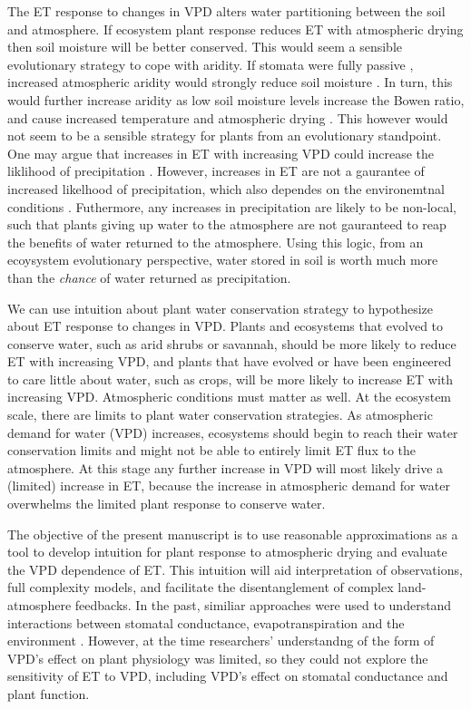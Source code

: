 \documentclass[draft,linenumbers]{agujournal}
\begin{document}
The ET response to changes in VPD alters water partitioning between
the soil and atmosphere. If ecosystem plant response reduces ET with atmospheric
drying then soil moisture will be better conserved. This would seem a
sensible evolutionary strategy to cope with aridity. If stomata were
fully passive \citep [similar to soil pores, e.g. ][]{Or_2013},
increased atmospheric aridity would strongly reduce soil moisture
\citep{Berg_2017}. In turn, this would further increase aridity as low
soil moisture levels increase the Bowen ratio, and cause increased
temperature and atmospheric drying \citep[][]{Bouchet_1963,
  Morton_1965, Brutsaert_1999, Ozdogan_2006, Salvucci_2013,
  Gentine_2016, Berg_2016}. This however would not seem to be a
sensible strategy for plants from an evolutionary standpoint. One may
argue that increases in ET with increasing VPD could increase the
liklihood of precipitation \citep[e.g.,][]{Findell_2011}. However,
increases in ET are not a gaurantee
of increased likelhood of precipitation, which also dependes on the
environemtnal conditions \citep[][]{Gentine_2013}. Futhermore,  any
increases in precipitation are likely to be non-local, such that plants giving up
water to the atmosphere are not gauranteed to reap the benefits of
water returned to the atmosphere. Using this logic, from an ecoysystem
evolutionary perspective, water stored in soil is worth much more than
the \textit{chance} of water returned as precipitation. 

We can use intuition about plant water conservation strategy to
hypothesize about ET response to changes in VPD. Plants and ecosystems
that evolved to conserve water, such as arid shrubs or savannah,
should be more likely to reduce ET with increasing VPD, and plants
that have evolved or have been engineered to care little about water,
such as crops, will be more likely to increase ET with increasing
VPD. Atmospheric conditions must matter as well. At the ecosystem
scale, there are limits to plant water conservation strategies. As
atmospheric demand for water (VPD) increases, ecosystems should begin
to reach their water conservation limits and might not be able to
entirely limit ET flux to the atmosphere. At this stage any further
increase in VPD will most likely drive a (limited) increase in ET,
because the increase in atmospheric demand for water overwhelms the
limited plant response to conserve water.

The objective of the present manuscript is to use reasonable
approximations as a tool to develop intuition for plant response to
atmospheric drying and evaluate the VPD dependence of ET. This
intuition will aid interpretation of observations, full complexity
models, and facilitate the disentanglement of complex land-atmosphere
feedbacks. In the past, similiar approaches were used to understand
interactions between stomatal conductance, evapotranspiration and the
environment \citep[e.g.,][]{Jarvis_1986, Mcnaughton_1991}. However, at
the time researchers' understandng of the form of VPD's effect on
plant physiology was limited, so they could not explore the
sensitivity of ET to VPD, including VPD's effect on stomatal
conductance and plant function.
\end{document}
